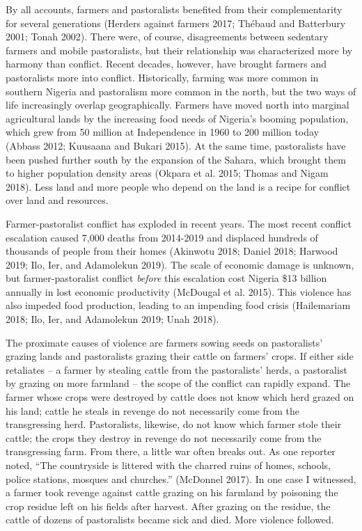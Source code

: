 \documentclass[11pt]{article}
\begin{document}
By all accounts, farmers and pastoralists benefited from their
complementarity for several generations (Herders against farmers 2017;
Thébaud and Batterbury 2001; Tonah 2002). There were, of course,
disagreements between sedentary farmers and mobile pastoralists, but
their relationship was characterized more by harmony than conflict.
Recent decades, however, have brought farmers and pastoralists more into
conflict. Historically, farming was more common in southern Nigeria and
pastoralism more common in the north, but the two ways of life
increasingly overlap geographically. Farmers have moved north into
marginal agricultural lands by the increasing food needs of Nigeria's
booming population, which grew from 50 million at Independence in 1960
to 200 million today (Abbass 2012; Kuusaana and Bukari 2015). At the
same time, pastoralists have been pushed further south by the expansion
of the Sahara, which brought them to higher population density areas
(Okpara et al. 2015; Thomas and Nigam 2018). Less land and more people
who depend on the land is a recipe for conflict over land and resources.

Farmer-pastoralist conflict has exploded in recent years. The most
recent conflict escalation caused 7,000 deaths from 2014-2019 and
displaced hundreds of thousands of people from their homes (Akinwotu
2018; Daniel 2018; Harwood 2019; Ilo, Ier, and Adamolekun 2019). The
scale of economic damage is unknown, but farmer-pastoralist conflict
\emph{before} this escalation cost Nigeria \$13 billion annually in lost
economic productivity (McDougal et al. 2015). This violence has also
impeded food production, leading to an impending food crisis
(Hailemariam 2018; Ilo, Ier, and Adamolekun 2019; Unah 2018).

The proximate causes of violence are farmers sowing seeds on
pastoralists' grazing lands and pastoralists grazing their cattle on
farmers' crops. If either side retaliates -- a farmer by stealing cattle
from the pastoralists' herds, a pastoralist by grazing on more farmland
-- the scope of the conflict can rapidly expand. The farmer whose crops
were destroyed by cattle does not know which herd grazed on his land;
cattle he steals in revenge do not necessarily come from the
transgressing herd. Pastoralists, likewise, do not know which farmer
stole their cattle; the crops they destroy in revenge do not necessarily
come from the transgressing farm. From there, a little war often breaks
out. As one reporter noted, ``The countryside is littered with the
charred ruins of homes, schools, police stations, mosques and
churches.'' (McDonnel 2017). In one case I witnessed, a farmer took
revenge against cattle grazing on his farmland by poisoning the crop
residue left on his fields after harvest. After grazing on the residue,
the cattle of dozens of pastoralists became sick and died. More violence
followed.
\end{document}
